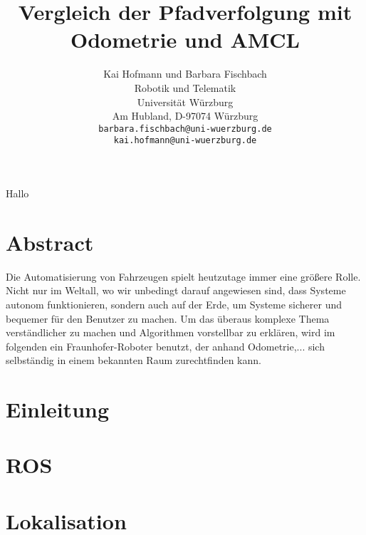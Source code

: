\documentclass[11pt,a4paper]{article}
\begin{document}
\sloppy
	
Hallo 


\title{\Large\bf Vergleich der Pfadverfolgung mit Odometrie und AMCL }

\author{Kai Hofmann und Barbara Fischbach\\
  Robotik und Telematik \\
  Universit\"at W\"urzburg\\
  Am Hubland, D-97074 W\"urzburg\\
{\small \texttt{barbara.fischbach@uni-wuerzburg.de}}\\
{\small \texttt{kai.hofmann@uni-wuerzburg.de}}}

\date{}




\maketitle

\newpage

\tableofcontents{}

\newpage

\twocolumn

\section*{Abstract}
{Die Automatisierung von Fahrzeugen spielt heutzutage immer eine gr\"o\ss{}ere Rolle. Nicht nur im Weltall, wo wir unbedingt darauf angewiesen sind, dass Systeme autonom funktionieren, sondern auch auf der Erde, um Systeme sicherer und bequemer f\"ur den Benutzer zu machen. Um das überaus komplexe Thema verst\"andlicher zu machen und Algorithmen vorstellbar zu erkl\"aren, wird im folgenden ein Fraunhofer-Roboter benutzt, der anhand Odometrie,... sich selbst\"andig in einem bekannten Raum zurechtfinden kann.}


\section{Einleitung}

\section{ROS}

\section{Lokalisation}
\end{document}
